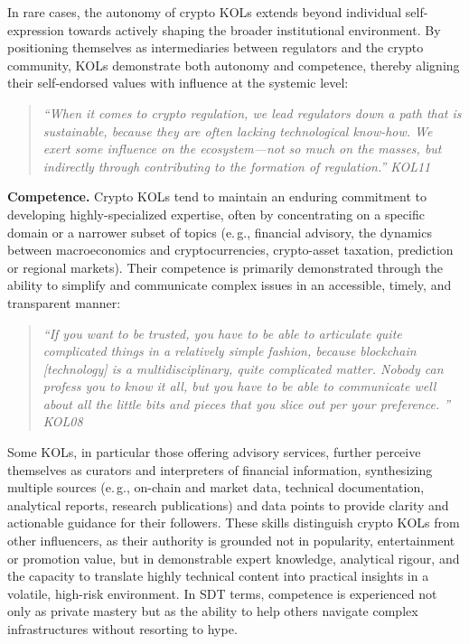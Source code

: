 In rare cases, the autonomy of crypto KOLs extends beyond individual self-expression towards actively shaping the broader institutional environment. By positioning themselves as intermediaries between regulators and the crypto community, KOLs demonstrate both autonomy and competence, thereby aligning their self-endorsed values with influence at the systemic level:
\begin{quote}\itshape
``When it comes to crypto regulation, we lead regulators down a path that is sustainable, because they are often lacking technological know-how. We exert some influence on the ecosystem---not so much on the masses, but indirectly through contributing to the formation of regulation.'' \textemdash{} KOL11
\end{quote}


\noindent\textbf{Competence.}
Crypto KOLs tend to maintain an enduring commitment to developing highly-specialized expertise, often by concentrating on a specific domain or a narrower subset of topics (e.\,g., financial advisory, the dynamics between macroeconomics and cryptocurrencies, crypto-asset taxation, prediction or regional markets). Their competence is primarily demonstrated through the ability to simplify and communicate complex issues in an accessible, timely, and transparent manner:

\begin{quote}\itshape
``If you want to be trusted, you have to be able to articulate quite complicated things in a relatively simple fashion, because blockchain [technology] is a multidisciplinary, quite complicated matter. Nobody can profess you to know it all, but you have to be able to communicate well about all the little bits and pieces that you slice out per your preference. '' 
 \textemdash{} KOL08
\end{quote}

Some KOLs, in particular those offering  advisory services, further perceive themselves as curators and interpreters of financial information, synthesizing multiple sources (e.\,g., on-chain and market data, technical documentation, analytical reports, research publications) and data points to provide clarity and actionable guidance for their followers. These skills distinguish crypto KOLs from other influencers, as their authority is grounded not in popularity, entertainment or promotion value, but in demonstrable expert knowledge, analytical rigour, and the capacity to translate highly technical content into practical insights in a volatile, high-risk environment. In SDT terms, competence is experienced not only as private mastery but as the ability to help others navigate complex infrastructures without resorting to hype.

